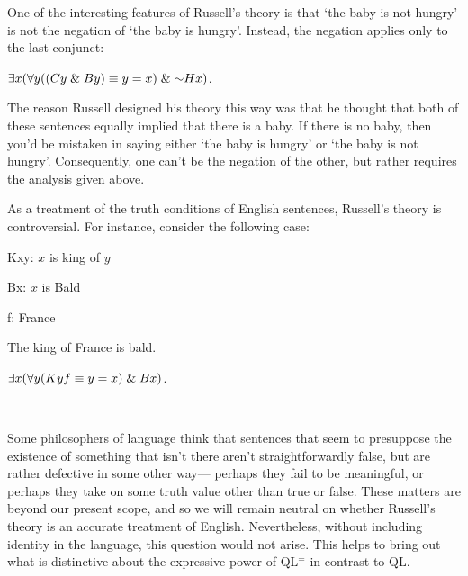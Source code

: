 One of the interesting features of Russell's theory is that `the baby is not hungry' is not the negation of `the baby is hungry'.
Instead, the negation applies only to the last conjunct:

\begin{earg}
  \item[\ex{Def4}] $\qt{\exists}{x} (\qt{\forall}{y} ((Cy \eand By) \eiff y = x) \eand \enot Hx)$.
\end{earg}

The reason Russell designed his theory this way was that he thought that both of these sentences equally implied that there is a baby.
If there is no baby, then you'd be mistaken in saying either `the baby is hungry' or `the baby is not hungry'.
Consequently, one can't be the negation of the other, but rather requires the analysis given above.

As a treatment of the truth conditions of English sentences, Russell's theory is controversial.
For instance, consider the following case:

\begin{multicols}{2}

\begin{ekey}
  \item[Kxy:] $x$ is king of $y$
  \item[Bx:] $x$ is Bald
  \item[f:] France
\end{ekey}

\begin{earg}
  \item[\ex{Def4}] The king of France is bald.
  \item[\ex{Def5}] $\exists x (\forall y (Kyf \equiv y = x) \mathrel\& Bx)$.
  \item[] ~
\end{earg}

\end{multicols}

Some philosophers of language think that sentences that seem to presuppose the existence of something that isn't there aren't straightforwardly false, but are rather defective in some other way--- perhaps they fail to be meaningful, or perhaps they take on some truth value other than true or false.
These matters are beyond our present scope, and so we will remain neutral on whether Russell's theory is an accurate treatment of English.
Nevertheless, without including identity in the language, this question would not arise.
This helps to bring out what is distinctive about the expressive power of QL$^=$ in contrast to QL. 








